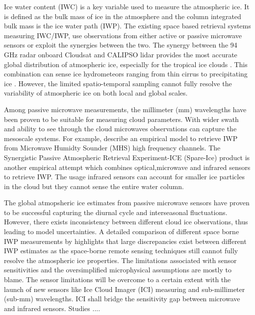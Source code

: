 \documentclass[amt, manuscript]{copernicus}
\begin{document}
Ice water content (IWC)  is a key variable used to measure the atmospheric ice. It is defined as the bulk mass of ice in the atmosphere and the column integrated bulk mass is the ice water path (IWP). The existing space based retrieval systems measuring IWC/IWP, use observations from either active or passive microwave sensors or exploit the synergies between the two. The synergy between the 94\,\,GHz radar onboard Cloudsat and CALIPSO lidar provides the most accurate global distribution of atmospheric ice, especially for the tropical ice clouds \citep{protat:theev:10}. This combination can sense ice hydrometeors ranging from thin cirrus to precipitating ice \citep{stephens:cloud:18}. However, the limited spatio-temporal sampling cannot fully resolve the  variability of atmospheric ice on both local and global scales. 

Among passive microwave measurements, the millimeter (mm) wavelengths have been proven to be suitable for measuring cloud parameters. With wider swath and ability to see through the cloud microwaves observations can capture the mesoscale systems. For example, \citet{gong:cloud:14} describe an empirical model to retrieve IWP from Microwave Humidty Sounder (MHS) high frequency channels. The Synergistic Passive Atmospheric Retrieval Experiment-ICE (Spare-Ice) product \citet{holl:spare:14} is another empirical attempt which combines optical,microwave and infrared sensors to retrieve IWP. The usage infrared sensors can account for smaller ice particles in the cloud but they cannot sense the entire water column. 

The global atmopsheric ice estimates from passive microwave sensors have proven to be successful capturing the diurnal cycle and interseasonal fluctuations. However, there exists inconsistency between different cloud ice observations, thus leading to model uncertainties. A detailed comparison of different space borne IWP measurements by \citet{duncan:anupd:18, eliasson:asses:11} highlights that large discrepancies exist between different IWP estimates as the space-borne remote sensing techniques still cannot fully resolve the atmospheric ice properties. The limitations associated with sensor sensitivities and the oversimplified microphysical assumptions are mostly to blame. The sensor limitations will be overcome to a certain extent with the launch of new sensors like Ice Cloud Imager (ICI) measuring and sub-millimeter (sub-mm) wavelengths. ICI shall bridge the sensitivity gap between microwave and infrared sensors. Studies ....
\end{document}
